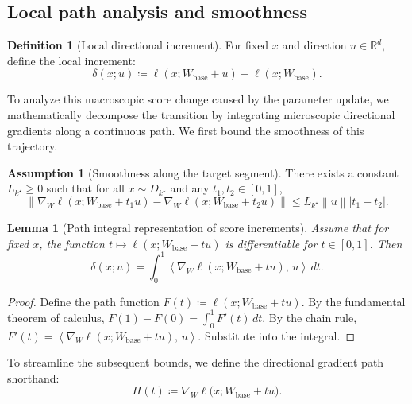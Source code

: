 \documentclass{article}
\theoremstyle{plain}
\newtheorem{lemma}{Lemma}
\theoremstyle{definition}
\newtheorem{definition}{Definition}
\newtheorem{assumption}{Assumption}
\theoremstyle{remark}
\numberwithin{theorem}{section}
\numberwithin{definition}{section}
\numberwithin{remark}{section}
\numberwithin{lemma}{section}
\numberwithin{assumption}{section}
\newcommand{\R}{\mathbb{R}}
\newcommand{\ip}[2]{\left\langle #1,\,#2 \right\rangle}
\newcommand{\norm}[1]{\left\lVert #1 \right\rVert}
\newcommand{\tindex}{k^\star}
\newcommand{\utarget}{u}
\begin{document}
\subsection{Local path analysis and smoothness}

\begin{definition}[Local directional increment]
\label{def:local_increment}
For fixed $x$ and direction $\utarget\in\R^d$, define the local increment:
\begin{equation}
\label{eq:local_increment}
\delta(x;\utarget)\coloneqq \ell(x;W_{\mathrm{base}}+\utarget)-\ell(x;W_{\mathrm{base}}).
\end{equation}
\end{definition}

To analyze this macroscopic score change caused by the parameter update, we mathematically decompose the transition by integrating microscopic directional gradients along a continuous path. We first bound the smoothness of this trajectory.

\begin{assumption}[Smoothness along the target segment]
\label{ass:smooth_path}
There exists a constant $L_{\tindex}\ge0$ such that for all $x\sim D_{\tindex}$ and any $t_1, t_2 \in [0, 1]$,
\[
\norm{\nabla_W \ell(x;W_{\mathrm{base}}+t_1 \utarget) - \nabla_W \ell(x;W_{\mathrm{base}}+t_2 \utarget)}
\le L_{\tindex} \norm{\utarget} |t_1-t_2|.
\]
\end{assumption}

\begin{lemma}[Path integral representation of score increments]
\label{lem:path}
Assume that for fixed $x$, the function $t\mapsto \ell(x;W_{\mathrm{base}}+t \utarget)$ is differentiable for $t\in[0,1]$.
Then
\begin{equation}
\label{eq:path}
\delta(x;\utarget)=\int_0^1 \ip{\nabla_W \ell(x;W_{\mathrm{base}}+t \utarget)}{\utarget}\,dt.
\end{equation}
\end{lemma}

\begin{proof}
Define the path function $F(t)\coloneqq \ell(x;W_{\mathrm{base}}+t \utarget)$.
By the fundamental theorem of calculus, $F(1)-F(0)=\int_0^1 F'(t)\,dt$.
By the chain rule, $F'(t)=\ip{\nabla_W \ell(x;W_{\mathrm{base}}+t \utarget)}{\utarget}$.
Substitute into the integral.
\end{proof}

\noindent To streamline the subsequent bounds, we define the directional gradient path shorthand:
\begin{equation}
\label{eq:grad_shorthand}
H(t)\coloneqq \nabla_W \ell\big(x;W_{\mathrm{base}}+t\utarget\big).
\end{equation}
\end{document}
